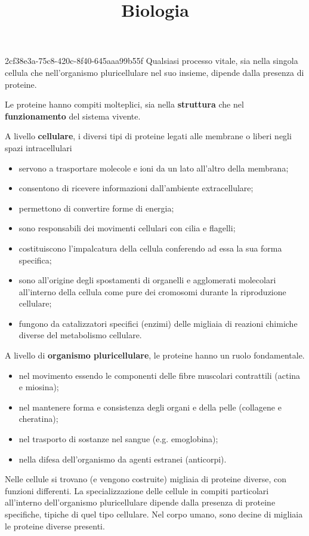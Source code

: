 \documentclass[preview]{standalone}
\begin{document}
\title{Biologia}
\genpage

\begin{snippet}{2cf38e3a-75c8-420c-8f40-645aaa99b55f}
    Qualsiasi processo vitale, sia nella singola cellula che nell'organismo pluricellulare nel suo
    insieme, dipende dalla presenza di proteine.

    Le proteine hanno compiti molteplici, sia nella \textbf{struttura}
    che nel \textbf{funzionamento} del sistema
    vivente.

    A livello \textbf{cellulare}, i diversi tipi di proteine legati alle membrane o liberi negli spazi
    intracellulari

    \begin{itemize}
        \item servono a trasportare molecole e ioni da un lato all'altro della membrana;
        \item consentono di ricevere informazioni dall'ambiente extracellulare;
        \item permettono di convertire forme di energia;
        \item sono responsabili dei movimenti cellulari con cilia e flagelli;
        \item costituiscono l'impalcatura della cellula conferendo ad essa la sua forma specifica;
        \item sono all'origine degli spostamenti di organelli e agglomerati molecolari all'interno della
        cellula come pure dei cromosomi durante la riproduzione cellulare;
        \item fungono da catalizzatori specifici (enzimi) delle migliaia di reazioni chimiche diverse del
        metabolismo cellulare.
    \end{itemize}

    A livello di \textbf{organismo pluricellulare}, le proteine hanno un ruolo
    fondamentale.

    \begin{itemize}
        \item nel movimento essendo le componenti delle fibre muscolari contrattili
        (actina e miosina);
        \item nel mantenere forma e consistenza degli organi e della pelle (collagene e
        cheratina);
        \item nel trasporto di sostanze nel sangue (e.g. emoglobina);
        \item nella difesa dell'organismo da agenti estranei (anticorpi).
    \end{itemize}
    
    Nelle cellule si trovano (e vengono costruite) migliaia di proteine diverse, con
    funzioni differenti. La specializzazione delle cellule in compiti particolari
    all'interno dell'organismo pluricellulare dipende dalla presenza di proteine
    specifiche, tipiche di quel tipo cellulare. Nel corpo umano, sono decine di
    migliaia le proteine diverse presenti.
\end{snippet}
\end{document}
